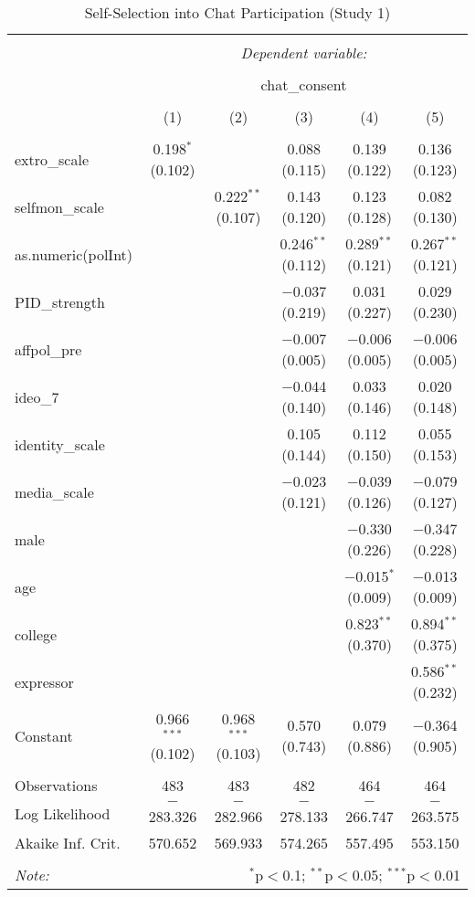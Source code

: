 
\begin{table}[H] \centering 
  \caption{Self-Selection into Chat Participation (Study 1)} 
  \label{tab:s1_selection_into_chat} 
\begin{tabular}{@{\extracolsep{5pt}}lccccc} 
\\[-1.8ex]\hline 
\hline \\[-1.8ex] 
 & \multicolumn{5}{c}{\textit{Dependent variable:}} \\ 
\cline{2-6} 
\\[-1.8ex] & \multicolumn{5}{c}{chat\_consent} \\ 
\\[-1.8ex] & (1) & (2) & (3) & (4) & (5)\\ 
\hline \\[-1.8ex] 
 extro\_scale & 0.198$^{*}$ (0.102) &  & 0.088 (0.115) & 0.139 (0.122) & 0.136 (0.123) \\ 
  selfmon\_scale &  & 0.222$^{**}$ (0.107) & 0.143 (0.120) & 0.123 (0.128) & 0.082 (0.130) \\ 
  as.numeric(polInt) &  &  & 0.246$^{**}$ (0.112) & 0.289$^{**}$ (0.121) & 0.267$^{**}$ (0.121) \\ 
  PID\_strength &  &  & $-$0.037 (0.219) & 0.031 (0.227) & 0.029 (0.230) \\ 
  affpol\_pre &  &  & $-$0.007 (0.005) & $-$0.006 (0.005) & $-$0.006 (0.005) \\ 
  ideo\_7 &  &  & $-$0.044 (0.140) & 0.033 (0.146) & 0.020 (0.148) \\ 
  identity\_scale &  &  & 0.105 (0.144) & 0.112 (0.150) & 0.055 (0.153) \\ 
  media\_scale &  &  & $-$0.023 (0.121) & $-$0.039 (0.126) & $-$0.079 (0.127) \\ 
  male &  &  &  & $-$0.330 (0.226) & $-$0.347 (0.228) \\ 
  age &  &  &  & $-$0.015$^{*}$ (0.009) & $-$0.013 (0.009) \\ 
  college &  &  &  & 0.823$^{**}$ (0.370) & 0.894$^{**}$ (0.375) \\ 
  expressor &  &  &  &  & 0.586$^{**}$ (0.232) \\ 
  Constant & 0.966$^{***}$ (0.102) & 0.968$^{***}$ (0.103) & 0.570 (0.743) & 0.079 (0.886) & $-$0.364 (0.905) \\ 
 \hline \\[-1.8ex] 
Observations & 483 & 483 & 482 & 464 & 464 \\ 
Log Likelihood & $-$283.326 & $-$282.966 & $-$278.133 & $-$266.747 & $-$263.575 \\ 
Akaike Inf. Crit. & 570.652 & 569.933 & 574.265 & 557.495 & 553.150 \\ 
\hline 
\hline \\[-1.8ex] 
\textit{Note:}  & \multicolumn{5}{r}{$^{*}$p$<$0.1; $^{**}$p$<$0.05; $^{***}$p$<$0.01} \\ 
\end{tabular} 
\end{table} 
